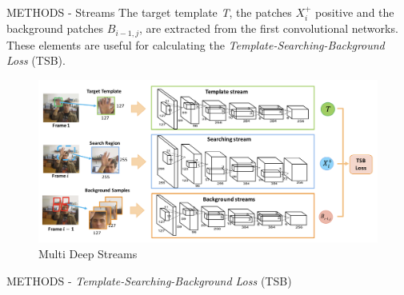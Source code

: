 \begin{frame}{METHODS - Streams}
    The target template \emph{T}, the patches $X_i^+$ positive and the background patches $B_{i-1,j}$, are extracted from the first convolutional networks. These elements are useful for calculating the \emph{Template-Searching-Background Loss} (TSB).
    \begin{figure}[h!]
        \centering
        \includegraphics[width = \linewidth]{images/paper8/streams.png}
        \centering
        \caption{Multi Deep Streams}
        \label{fig:streams}
    \end{figure}
\end{frame}

\begin{frame}{METHODS - \emph{Template-Searching-Background Loss} (TSB)}
    
\end{frame}